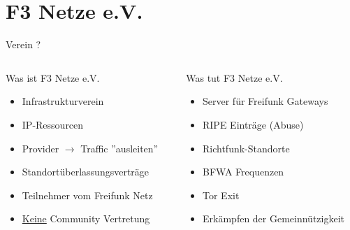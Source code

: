 \section{F3 Netze e.V.}

\begin{frame}{Verein ?}
    \begin{columns}[T]
        \begin{column}{0.45\textwidth}
            Was ist F3 Netze e.V.
            \begin{itemize}
                \item Infrastrukturverein
                \item IP-Ressourcen
                \item Provider $\rightarrow$ Traffic ''ausleiten''
                \item Standortüberlassungsverträge
                \item Teilnehmer vom Freifunk Netz
                \item \underline{Keine} Community Vertretung
            \end{itemize}
        \end{column}
        \begin{column}{0.45\textwidth}
            Was tut F3 Netze e.V.
            \begin{itemize}
                \item Server für Freifunk Gateways
                \item RIPE Einträge (Abuse)
                \item Richtfunk-Standorte
                \item BFWA Frequenzen
                \item Tor Exit
                \item Erkämpfen der Gemeinnützigkeit
            \end{itemize}
        \end{column}
    \end{columns}
\end{frame}


